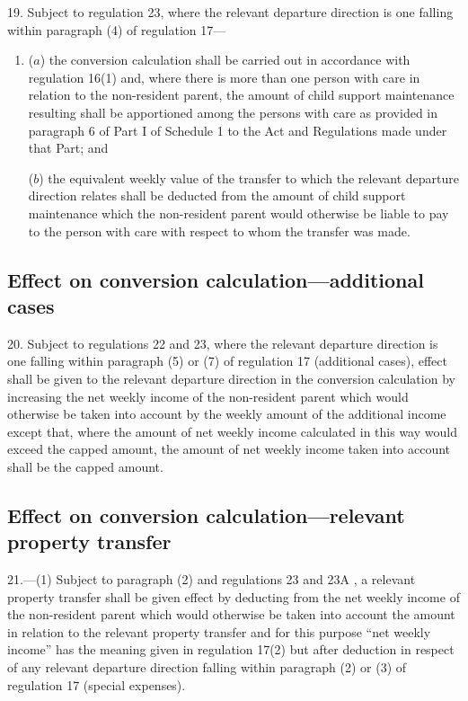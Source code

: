 \documentclass[12pt,a4paper]{article}
\begin{document}
19.  Subject to regulation 23, where the relevant departure direction is one falling within paragraph (4) of regulation 17—
\begin{enumerate}\item[]
($a$) the conversion calculation shall be carried out in accordance with regulation 16(1) and, where there is more than one person with care in relation to the non-resident parent, the amount of child support maintenance resulting shall be apportioned among the persons with care as provided in paragraph 6 of Part I of Schedule 1 to the Act and Regulations made under that Part; and

($b$) the equivalent weekly value of the transfer to which the relevant departure direction relates shall be deducted from the amount of child support maintenance which the non-resident parent would otherwise be liable to pay to the person with care with respect to whom the transfer was made.
\end{enumerate}

\subsection[20. Effect on conversion calculation—additional cases]{Effect on conversion calculation—additional cases}

20.  Subject to regulations 22 and 23, where the relevant departure direction is one falling within paragraph (5) or (7) of regulation 17 (additional cases), effect shall be given to the relevant departure direction in the conversion calculation by increasing the net weekly income of the non-resident parent which would otherwise be taken into account by the weekly amount of the additional income except that, where the amount of net weekly income calculated in this way would exceed the capped amount, the amount of net weekly income taken into account shall be the capped amount.

\subsection[21. Effect on conversion calculation—relevant property transfer]{Effect on conversion calculation—relevant property transfer}

21.---(1)  Subject to paragraph (2) and 
regulations 23 and 23A%
, a relevant property transfer shall be given effect by deducting from the net weekly income of the non-resident parent which would otherwise be taken into account the amount in relation to the relevant property transfer and for this purpose “net weekly income” has the meaning given in regulation 17(2) but after deduction in respect of any relevant departure direction falling within paragraph (2) or (3) of regulation 17 (special expenses).
\end{document}
